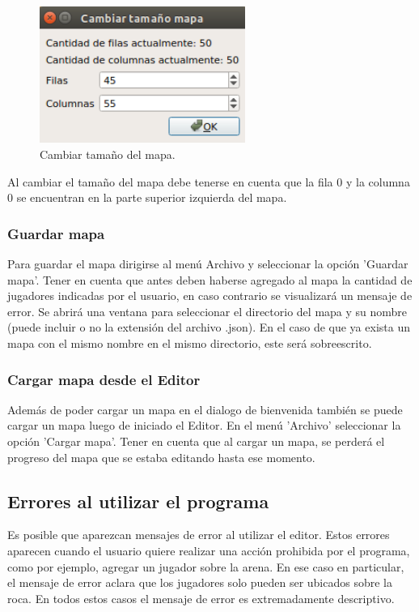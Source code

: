 \documentclass[titlepage,a4paper,12pt]{article}
\begin{document}
\begin{figure}[H]
	\centering
	\includegraphics[width=0.6\textwidth]{../imagenes/cambiar_tamanio.png}
	\caption{\label{fig:menu_editor} Cambiar tamaño del mapa.}
\end{figure}

Al cambiar el tamaño del mapa debe tenerse en cuenta que la fila 0 y la columna 0 se encuentran en la parte superior izquierda del mapa.\\

\subsubsection{Guardar mapa}

Para guardar el mapa dirigirse al menú Archivo y seleccionar la opción 'Guardar mapa'. Tener en cuenta que antes deben haberse agregado al mapa la cantidad de jugadores indicadas por el usuario, en caso contrario se visualizará un mensaje de error. Se abrirá una ventana para seleccionar el directorio del mapa y su nombre (puede incluir o no la extensión del archivo .json). En el caso de que ya exista un mapa con el mismo nombre en el mismo directorio, este será sobreescrito.

\subsubsection{Cargar mapa desde el Editor}

Además de poder cargar un mapa en el dialogo de bienvenida también se puede cargar un mapa luego de iniciado el Editor. En el menú 'Archivo' seleccionar la opción 'Cargar mapa'. Tener en cuenta que al cargar un mapa, se perderá el progreso del mapa que se estaba editando hasta ese momento.

\subsection{Errores al utilizar el programa}

Es posible que aparezcan mensajes de error al utilizar el editor. Estos errores aparecen cuando el usuario quiere realizar una acción prohibida por el programa, como por ejemplo, agregar un jugador sobre la arena. En ese caso en particular, el mensaje de error aclara que los jugadores solo pueden ser ubicados sobre la roca. En todos estos casos el mensaje de error es extremadamente descriptivo.
\end{document}
